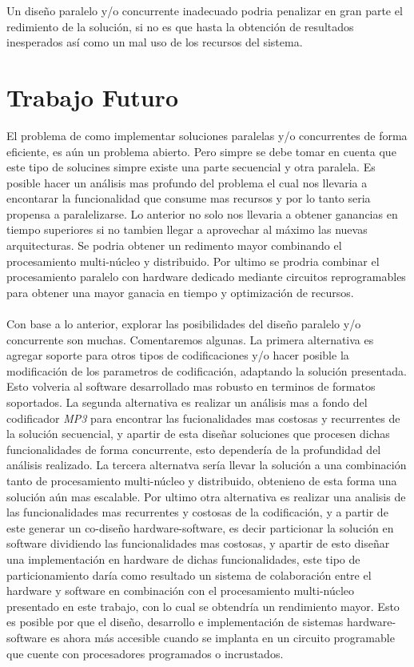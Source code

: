 Un diseño paralelo y/o concurrente inadecuado podria penalizar en gran parte el redimiento de la solución, si no es que hasta la obtención de resultados inesperados así como un mal uso de los recursos del sistema.

\section{Trabajo Futuro}
El problema de como implementar soluciones paralelas y/o concurrentes de forma eficiente, es aún un problema abierto. Pero simpre se debe tomar en cuenta que este tipo de solucines simpre existe una parte secuencial y otra paralela. Es posible hacer un análisis mas profundo del problema el cual nos llevaria a encontarar la funcionalidad que consume mas recursos y por lo tanto seria propensa a paralelizarse. Lo anterior no solo nos llevaria a obtener ganancias en tiempo superiores si no tambien llegar a aprovechar al máximo las nuevas arquitecturas. Se podria obtener un redimento mayor combinando el procesamiento multi-núcleo y distribuido. Por ultimo se prodria combinar el procesamiento paralelo con hardware dedicado mediante circuitos reprogramables para obtener una mayor ganacia en tiempo y optimización de recursos.\\\\
Con base a lo anterior, explorar las posibilidades del diseño paralelo y/o concurrente son muchas. Comentaremos algunas. La primera alternativa es agregar soporte para otros tipos de codificaciones y/o hacer posible la modificación de los parametros de codificación, adaptando la solución presentada. Esto volveria al software desarrollado mas robusto en terminos de formatos soportados. La segunda alternativa es realizar un análisis mas a fondo del codificador \textit{MP3} para encontrar las fucionalidades mas costosas y recurrentes de la solución secuencial, y apartir de esta diseñar soluciones que procesen dichas funcionalidades de forma concurrente, esto dependería de la profundidad del análisis realizado. La tercera alternatva sería llevar la solución a una combinación tanto de procesamiento multi-núcleo y distribuido, obtenieno de esta forma una solución aún mas escalable. Por ultimo otra alternativa es realizar una analisis de las funcionalidades mas recurrentes y costosas de la codificación, y a partir de este generar un co-diseño hardware-software, es decir particionar la solución en software dividiendo las funcionalidades mas costosas, y apartir de esto diseñar una implementación en hardware de dichas funcionalidades, este tipo de particionamiento daría como resultado un sistema de colaboración entre el hardware y software en combinación con el procesamiento multi-núcleo presentado en este trabajo, con lo cual se obtendría un rendimiento mayor. Esto es posible por que el diseño, desarrollo e implementación de sistemas hardware-software es ahora más accesible cuando se implanta en un circuito programable que cuente con procesadores programados o incrustados.